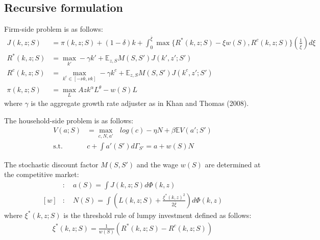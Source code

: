 \subsection*{Recursive formulation}
Firm-side problem is as follows:
\begin{align*}
  J(k,z;S) &= \pi(k,z;S) + (1-\delta)k + \int_{0}^{\overline{\xi}} \max\{R^{*}(k,z;S)-\xi w(S),R^{c}(k,z;S)\}\left(\frac{1}{\overline{\xi}}\right)d\xi
  \\
  R^{*}(k,z;S) &= \max_{k'} -\gamma k' + \mathbb{E}_{z,S} M(S,S') J(k',z';S')
  \\
  R^{c}(k,z;S) &= \max_{k^{c}\in[-\nu k,\nu k]} -\gamma k^{c} + \mathbb{E}_{z,S} M(S,S') J(k^{c},z';S')
  \\
  \pi(k,z;S) &=  \max_{L} Azk^{\alpha}L^{\theta} - w(S)L
\end{align*}
where $\gamma$ is the aggregate growth rate adjuster as in Khan and Thomas (2008).

The household-side problem is as follows:
\begin{align*}
  V(a;S) &= \max_{c,N,a'}\text{ } log(c) - \eta N + \beta \mathbb{E}V(a';S')
  \\
  \text{s.t.}\quad& c + \int a'(S') d\Gamma_{S'} =  a + w(S)N
\end{align*}

The stochastic discount factor $M(S,S')$ and the wage $w(S)$ are determined at the competitive market:
\begin{align*}
  [M]&:\quad a(S) = \int J(k,z;S) d\Phi(k,z)
  \\
  [w]&:\quad N(S) = \int \left(L(k,z;S) + \frac{\xi^{*}(k,z)^{2}}{2\overline{\xi}}\right) d\Phi(k,z)
\end{align*}
where $\xi^{*}(k,z;S)$ is the threshold rule of lumpy investment defined as follows:
\begin{align*}
  \xi^{*}(k,z;S) = \frac{1}{w(S)}\left(R^{*}(k,z;S) - R^{c}(k,z;S)\right)
\end{align*}

